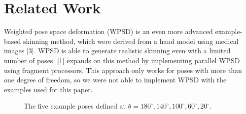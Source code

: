 \documentclass[10pt,twocolumn,letterpaper]{article}
\begin{document}
\section{Related Work}

Weighted pose space deformation (WPSD) is an even more advanced example-based skinning method, which were derived from a hand model using medical images [3]. WPSD is able to generate realistic skinning even with a limited number of poses. [1] expands on this method by implementing parallel WPSD using fragment processors. This approach only works for poses with more than one degree of freedom, so we were not able to implement WPSD with the examples used for this paper.

\begin{figure}
\begin{center}
\end{center}
   \caption{The five example poses defined at $\theta = 180^{\circ}, 140^{\circ}, 100^{\circ}, 60^{\circ}, 20^{\circ}$.}
\label{fig:short}
\end{figure}
\end{document}
